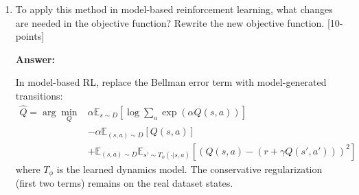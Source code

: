\documentclass[12pt]{article}
\begin{document}
{{\begin{enumerate}
Substitute $\mu^*$ back into the objective for a single state $s$:
$$
\mathbb{E}_{a \sim \mu^*(\cdot|s)} [Q(s, a)] + \mathcal{H}(\mu^*(\cdot|s)) = \sum_a \mu^*(a|s) Q(s, a) - \sum_a \mu^*(a|s) \log \mu^*(a|s).
$$
Using $\mu^*(a|s) = \frac{\exp(Q(s, a))}{Z(s)}$ where $Z(s) = \sum_a \exp(Q(s, a))$:
\begin{align*}
&\sum_a \frac{\exp(Q(s, a))}{Z(s)} Q(s, a)
- \sum_a \frac{\exp(Q(s, a))}{Z(s)} \log \left( \frac{\exp(Q(s, a))}{Z(s)} \right) \\
&= \sum_a \frac{\exp(Q(s, a))}{Z(s)} Q(s, a)
- \sum_a \frac{\exp(Q(s, a))}{Z(s)} \left( Q(s, a) - \log Z(s) \right)
\end{align*}

Simplify:
\begin{align*}
&= \sum_a \frac{\exp(Q(s, a))}{Z(s)} Q(s, a)
   - \sum_a \frac{\exp(Q(s, a))}{Z(s)} Q(s, a) \\
&\quad + \log Z(s) \sum_a \frac{\exp(Q(s, a))}{Z(s)} \\
&= 0 + \log Z(s) \cdot 1 \\
&= \log Z(s)
\end{align*}
Thus, the maximum value is $\log \sum_a \exp(Q(s, a))$.

The inner maximization (over states) yields:
$$
\alpha \mathbb{E}_{s \sim \mathcal{D}} \left[ \log \sum_a \exp(Q(s, a)) \right] - \alpha \mathbb{E}_{s,a \sim \mathcal{D}} [Q(s, a)].
$$

The minimization objective is:
\begin{align*}
\hat{Q} = \arg \min_Q & \alpha \mathbb{E}_{s \sim D} \left[ \log \sum_a \exp(\alpha Q(s,a)) \right] \\
& - \alpha \mathbb{E}_{(s,a) \sim D} [Q(s,a)] \\
& + \mathbb{E}_{(s,a,s') \sim D} \left[ (Q(s,a) - (r + \gamma Q(s',a'))^2 \right]
\end{align*}

\item To apply this method in model-based reinforcement learning, what changes are needed in the objective function? Rewrite the new objective function. [10-points]

\textbf{Answer:}

In model-based RL, replace the Bellman error term with model-generated transitions:
\begin{align*}
\hat{Q} = \arg \min_Q & \alpha \mathbb{E}_{s \sim D} \left[ \log \sum_a \exp(\alpha Q(s,a)) \right] \\
& - \alpha \mathbb{E}_{(s,a) \sim D} [Q(s,a)] \\
& + \mathbb{E}_{(s,a) \sim D} \mathbb{E}_{s' \sim T_{\phi}(\cdot|s,a)} \left[ (Q(s,a) - (r + \gamma Q(s',a')))^2 \right]
\end{align*}
where $T_{\phi}$ is the learned dynamics model. The conservative regularization (first two terms) remains on the real dataset states.


\end{enumerate}


}}
\end{document}
